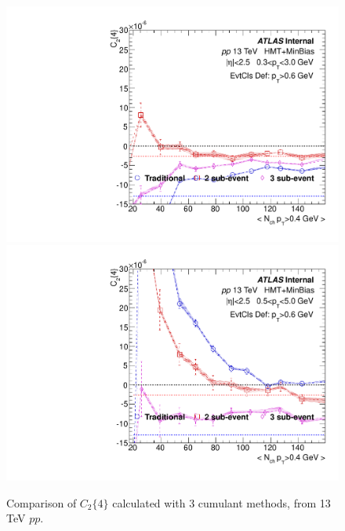 \begin{figure}[p]
\includegraphics[width=0.4\linewidth]{figs/sec_result/pp13/phy_4PC_Har0_Pt0_Cls3.pdf}
\includegraphics[width=0.4\linewidth]{figs/sec_result/pp13/phy_4PC_Har0_Pt1_Cls3.pdf}
\caption{Comparison of $C_{2}\{4\}$ calculated with 3 cumulant methods, from 13 TeV $pp$.}
\label{fig:result_pp13_C24}
\end{figure}
\clearpage

